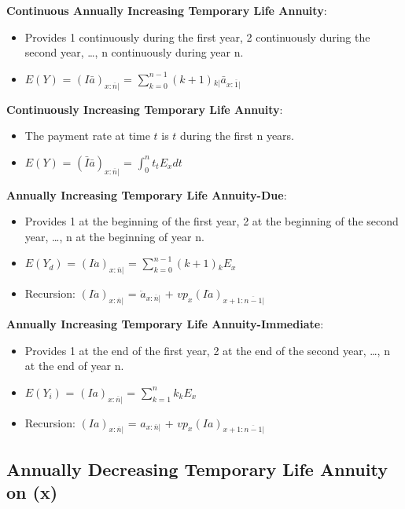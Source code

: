 \documentclass[]{book}
\begin{document}
\textbf{Continuous Annually Increasing Temporary Life Annuity}:

\begin{itemize}
\item
  Provides 1 continuously during the first year, 2 continuously during
  the second year, \ldots{}, n continuously during year n.
\item
  \(E(Y)\) = \((I\bar{a})_{x: \overline{n}|}\) =
  \(\sum^{n - 1}_{k = 0} (k + 1){}_{k|}\bar{a}_{x:\overline{1}|}\)
\end{itemize}

\textbf{Continuously Increasing Temporary Life Annuity}:

\begin{itemize}
\item
  The payment rate at time \(t\) is \(t\) during the first n years.
\item
  \(E(Y)\) = \((\bar{I}\bar{a})_{x: \overline{n}|}\) =
  \(\int^{n}_0 t{}_{t}E_x dt\)
\end{itemize}

\textbf{Annually Increasing Temporary Life Annuity-Due}:

\begin{itemize}
\item
  Provides 1 at the beginning of the first year, 2 at the beginning of
  the second year, \ldots{}, n at the beginning of year n.
\item
  \(E(Y_d)\) = \((I\ddot{a})_{x: \overline{n}|}\) =
  \(\sum^{n - 1}_{k = 0} (k + 1){}_{k}E_x\)
\item
  Recursion: \((I\ddot{a})_{x: \overline{n}|}\) =
  \(\ddot{a}_{x: \overline{n}|}\) +
  \(vp_x(I\ddot{a})_{x + 1: \overline{n - 1}|}\)
\end{itemize}

\textbf{Annually Increasing Temporary Life Annuity-Immediate}:

\begin{itemize}
\item
  Provides 1 at the end of the first year, 2 at the end of the second
  year, \ldots{}, n at the end of year n.
\item
  \(E(Y_i)\) = \((Ia)_{x: \overline{n}|}\) =
  \(\sum^{n}_{k = 1} k{}_{k}E_x\)
\item
  Recursion: \((Ia)_{x: \overline{n}|}\) = \(a_{x: \overline{n}|}\) +
  \(vp_x(Ia)_{x + 1: \overline{n - 1}|}\)
\end{itemize}

\subsection{Annually Decreasing Temporary Life Annuity on
(x)}\label{annually-decreasing-temporary-life-annuity-on-x}
\end{document}
